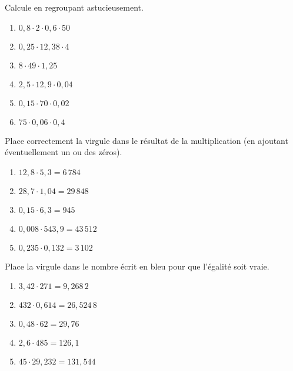 \begin{exercice}
Calcule en regroupant astucieusement.
\begin{enumerate} 
 \item $0,8 \cdot 2 \cdot 0,6 \cdot 50$ \dotfill \hspace*{8em}
 
 \item $0,25 \cdot 12,38 \cdot 4$ \dotfill \hspace*{8em}
 
 \item $8 \cdot 49 \cdot 1,25$ \dotfill \hspace*{8em}
 
 \item $2,5 \cdot 12,9 \cdot 0,04$ \dotfill \hspace*{8em}
 
 \item $0,15 \cdot 70 \cdot 0,02$ \dotfill \hspace*{8em}
 
 \item $75 \cdot 0,06 \cdot 0,4$ \dotfill \hspace*{8em}
 
 \end{enumerate} %
\end{exercice}


\begin{exercice}
Place correctement la virgule dans le résultat de la multiplication (en ajoutant éventuellement un ou des zéros).
\begin{enumerate} 
 \item $12,8 \cdot  5,3 = 6\,784$
 \item $28,7 \cdot 1,04 = 29\,848$
 \item $0,15 \cdot 6,3 = 945$
 \item $0,008 \cdot 543,9 = 43\,512$
 \item $0,235 \cdot 0,132 = 3\,102$
 \end{enumerate}
\end{exercice}


\begin{exercice}
Place la virgule dans le nombre écrit en bleu pour que l'égalité soit vraie. %
\begin{enumerate} 
 \item $3,42 \cdot 271 = 9,268\,2$
 \item $432 \cdot 0,614 = 26,524\,8$
 \item $0,48 \cdot 62 = 29,76$
 \item $2,6 \cdot 485 = 126,1$
 \item $45 \cdot 29,232 = 131,544$
 \end{enumerate}
\end{exercice}

